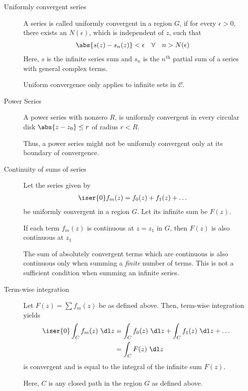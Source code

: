 \begin{description}
    \item[Uniformly convergent series] A series is called uniformly convergent in a
        region $ G $, if for every $ \epsilon > 0 $, there exists an $ N(\epsilon) $, which
        is independent of $ z $, such that
        \begin{align}
            \abs{s(z) - s_n(z)} & < \epsilon & \forall \quad n & > N(\epsilon)
        \end{align}
        Here, $ s $ is the infinite series sum and $ s_n $ is the $n^{\text{th}}$
        partial sum of a series with general complex terms. \par
        Uniform convergence only applies to infinite sets in $ \mathcal{C} $.

    \item[Power Series] A power series with nonzero $ R $, is uniformly convergent in
        every circular disk $ \abs{z - z_0} \leq r $ of radius $ r < R $. \par
        Thus, a power series might not be uniformly convergent only at its boundary of
        convergence.

    \item[Continuity of sums of series] Let the series given by
        \begin{align}
            \iser{0} f_m(z) & = f_0(z) + f_1(z) + \dots
        \end{align}
        be uniformly convergent in a region $ G $. Let its infinite sum be $ F(z) $.\par
        If each term $ f_m(z) $ is continuous at $ z = z_1 $ in $ G $, then $ F(z) $
        is also continuous at $ z_1 $ \par
        The sum of absolutely convergent terms which are continuous is also continuous
        only when summing a \emph{finite} number of terms. This is not a sufficient
        condition when summing an infinite series.

    \item[Term-wise integration] Let $ F(z) = \sum f_m(z) $ be as defined above. Then,
        term-wise integration yields
        \begin{align}
            \iser{0} \int_C f_m(z)\ \dl z & = \int_C f_0(z)\ \dl z + \int_C f_1(z)
            \ \dl z + \dots                                                        \\
                                          & = \int_C F(z)\ \dl z
        \end{align}
        is convergent and is equal to the integral of the infinite sum $ F(z) $. \par
        Here, $ C $ is any closed path in the region $ G $ as defined above.


\end{description}
